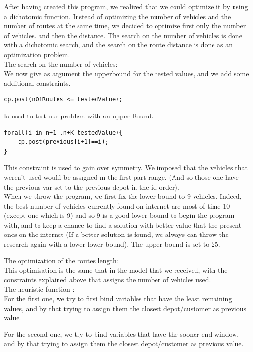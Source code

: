 \documentclass[a4paper ,12pt,french]{article}
\begin{document}
After having created this program, we realized that we could optimize it by using a dichotomic function. Instead of optimizing the number of vehicles and the number of routes at the same time, we decided to optimize first only the number of vehicles, and then the distance. The search on the number of vehicles is done with a dichotomic search, and the search on the route distance is done as an optimization problem.\\

The search on the number of vehicles:\\
We now give as argument the upperbound for the tested values, and we add some additional constraints. 
\begin{verbatim}
cp.post(nOfRoutes <= testedValue);
\end{verbatim}
Is used to test our problem with an upper Bound.
\begin{verbatim}
forall(i in n+1..n+K-testedValue){
	cp.post(previous[i+1]==i);
}
\end{verbatim}
This constraint is used to gain over symmetry. We imposed that the vehicles that weren't used would be assigned in the first part range. (And so those one have the previous var set to the previous depot in the id order).\\


When we throw the program, we first fix the lower bound to 9 vehicles. Indeed, the best number of vehicles currently found on internet are most of time 10 (except one which is 9) and so 9 is a good lower bound to begin the program with, and to keep a chance to find a solution with better value that the present ones on the internet (If a better solution is found, we always can throw the research again with a lower lower bound). The upper bound is set to 25.



          
The optimization of the routes length:\\
This optimisation is the same that in the model that we received, with the constraints explained above that assigns the number of vehicles used.\\

The heuristic function :\\


For the first one, we try  to first bind variables that have the least remaining values, and by that trying to assign them the closest depot/customer as previous value.

For the second one, we try to bind variables that have the sooner end window, and by that trying to assign them  the closest depot/customer as previous value.
\end{document}
